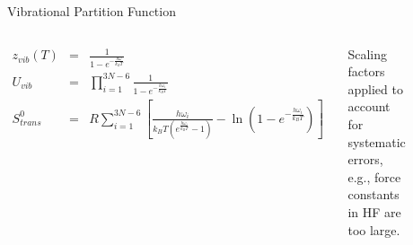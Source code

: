 \documentclass[aspectratio=169]{beamer}
\begin{document}
\begin{frame}{Vibrational Partition Function}
\begin{columns}

\begin{eqnarray*}
    z_{vib}(T) & = & \frac{1}{1-e^{-\frac{h\omega}{k_BT}}}\\
    U_{vib} & = & \prod_{i=1}^{3N-6} \frac{1}{1-e^{-\frac{h\omega_i}{k_BT}}}\\
    S_{trans}^0 & = & R \sum_{i=1}^{3N-6} \left [ \frac{h\omega_i}{k_BT(e^{\frac{h\omega_i}{k_BT}}-1)} - \ln (1-e^{-\frac{h\omega_i}{k_BT}}) \right ]
\end{eqnarray*}

Scaling factors applied to account for systematic errors, e.g., force constants in HF are too large.


\begin{figure}
    \centering
    \includegraphics[width=\linewidth]{lectures/figures/4_scaling_factors.png}
\end{figure}
\end{columns} 

\end{frame}
\end{document}
